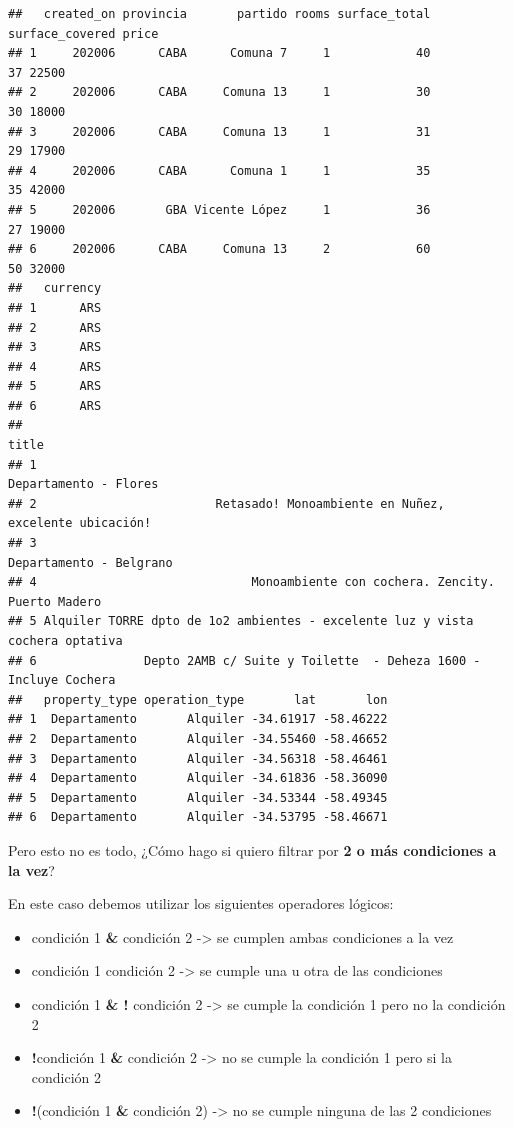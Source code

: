 \documentclass[
  spanish,
]{book}
\providecommand{\tightlist}{%
  \setlength{\itemsep}{0pt}\setlength{\parskip}{0pt}}
\begin{document}
\begin{verbatim}
##   created_on provincia       partido rooms surface_total surface_covered price
## 1     202006      CABA      Comuna 7     1            40              37 22500
## 2     202006      CABA     Comuna 13     1            30              30 18000
## 3     202006      CABA     Comuna 13     1            31              29 17900
## 4     202006      CABA      Comuna 1     1            35              35 42000
## 5     202006       GBA Vicente López     1            36              27 19000
## 6     202006      CABA     Comuna 13     2            60              50 32000
##   currency
## 1      ARS
## 2      ARS
## 3      ARS
## 4      ARS
## 5      ARS
## 6      ARS
##                                                                           title
## 1                                                         Departamento - Flores
## 2                         Retasado! Monoambiente en Nuñez, excelente ubicación!
## 3                                                       Departamento - Belgrano
## 4                              Monoambiente con cochera. Zencity. Puerto Madero
## 5 Alquiler TORRE dpto de 1o2 ambientes - excelente luz y vista cochera optativa
## 6               Depto 2AMB c/ Suite y Toilette  - Deheza 1600 - Incluye Cochera
##   property_type operation_type       lat       lon
## 1  Departamento       Alquiler -34.61917 -58.46222
## 2  Departamento       Alquiler -34.55460 -58.46652
## 3  Departamento       Alquiler -34.56318 -58.46461
## 4  Departamento       Alquiler -34.61836 -58.36090
## 5  Departamento       Alquiler -34.53344 -58.49345
## 6  Departamento       Alquiler -34.53795 -58.46671
\end{verbatim}

Pero esto no es todo, ¿Cómo hago si quiero filtrar por \textbf{2 o más condiciones a la vez}?

En este caso debemos utilizar los siguientes operadores lógicos:

\begin{itemize}
\tightlist
\item
  condición 1 \textbf{\&} condición 2 -\textgreater{} se cumplen ambas condiciones a la vez
\item
  condición 1 \textbf{\textbar{}} condición 2 -\textgreater{} se cumple una u otra de las condiciones
\item
  condición 1 \textbf{\& !} condición 2 -\textgreater{} se cumple la condición 1 pero no la condición 2
\item
  \textbf{!}condición 1 \textbf{\&} condición 2 -\textgreater{} no se cumple la condición 1 pero si la condición 2
\item
  \textbf{!}(condición 1 \textbf{\&} condición 2) -\textgreater{} no se cumple ninguna de las 2 condiciones
\end{itemize}
\end{document}
